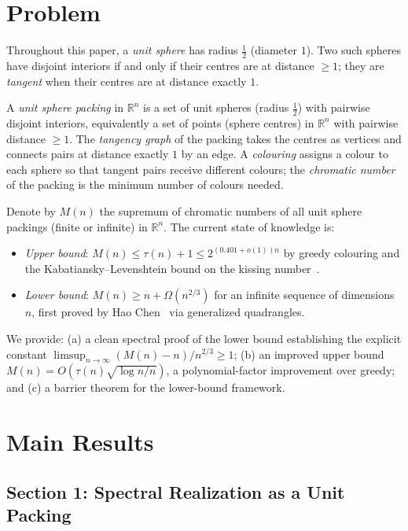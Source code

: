 \documentclass{article}
\theoremstyle{definition}
\begin{document}
\section*{Problem}

Throughout this paper, a \emph{unit sphere} has radius $\tfrac{1}{2}$ (diameter $1$).  Two such spheres have disjoint interiors if and only if their centres are at distance $\ge 1$; they are \emph{tangent} when their centres are at distance exactly $1$.

A \emph{unit sphere packing} in $\mathbb{R}^n$ is a set of unit spheres (radius $\tfrac{1}{2}$) with pairwise disjoint interiors, equivalently a set of points (sphere centres) in $\mathbb{R}^n$ with pairwise distance $\ge 1$. The \emph{tangency graph} of the packing takes the centres as vertices and connects pairs at distance exactly $1$ by an edge. A \emph{colouring} assigns a colour to each sphere so that tangent pairs receive different colours; the \emph{chromatic number} of the packing is the minimum number of colours needed.

Denote by $M(n)$ the supremum of chromatic numbers of all unit sphere packings (finite or infinite) in $\mathbb{R}^n$. The current state of knowledge is:
\begin{itemize}
  \item \textit{Upper bound}: $M(n)\le \tau(n)+1\le 2^{(0.401+o(1))n}$ by greedy colouring and the Kabatiansky--Levenshtein bound on the kissing number~\cite{KL1978}.
  \item \textit{Lower bound}: $M(n)\ge n+\Omega(n^{2/3})$ for an infinite sequence of dimensions $n$, first proved by Hao Chen~\cite{Chen2015} via generalized quadrangles.
\end{itemize}
We provide: (a) a clean spectral proof of the lower bound establishing the explicit constant $\limsup_{n\to\infty}(M(n)-n)/n^{2/3}\ge 1$; (b) an improved upper bound $M(n)=O(\tau(n)\sqrt{\log n/n})$, a polynomial-factor improvement over greedy; and (c) a barrier theorem for the lower-bound framework.

\section*{Main Results}

\subsection*{Section 1: Spectral Realization as a Unit Packing}
\end{document}
